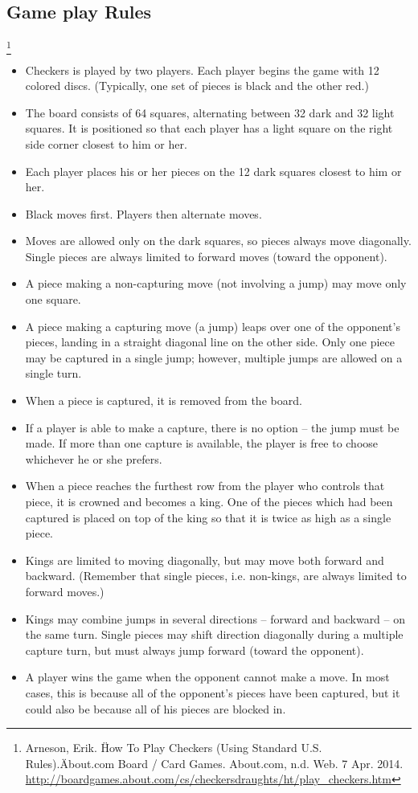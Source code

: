 \documentclass[10pt]{article}
\begin{document}
	\subsection{Game play Rules}\footnote{Arneson, Erik. \"How To Play Checkers (Using Standard U.S. Rules).\" About.com Board / Card Games. About.com, n.d. Web. 7 Apr. 2014. \url{http://boardgames.about.com/cs/checkersdraughts/ht/play_checkers.htm}}
	\begin{itemize}
		\item Checkers is played by two players. Each player begins the game with 12 colored discs. (Typically, one set of pieces is black and the other red.)
		\item The board consists of 64 squares, alternating between 32 dark and 32 light squares. It is positioned so that each player has a light square on the right side corner closest to him or her.
		\item Each player places his or her pieces on the 12 dark squares closest to him or her.
		\item Black moves first. Players then alternate moves.
		\item Moves are allowed only on the dark squares, so pieces always move diagonally. Single pieces are always limited to forward moves (toward the opponent).
		\item A piece making a non-capturing move (not involving a jump) may move only one square.
		\item A piece making a capturing move (a jump) leaps over one of the opponent's pieces, landing in a straight diagonal line on the other side. Only one piece may be captured in a single jump; however, multiple jumps are allowed on a single turn.
		\item When a piece is captured, it is removed from the board.
		\item If a player is able to make a capture, there is no option -- the jump must be made. If more than one capture is available, the player is free to choose whichever he or she prefers.
		\item When a piece reaches the furthest row from the player who controls that piece, it is crowned and becomes a king. One of the pieces which had been captured is placed on top of the king so that it is twice as high as a single piece.
		\item Kings are limited to moving diagonally, but may move both forward and backward. (Remember that single pieces, i.e. non-kings, are always limited to forward moves.)
		\item Kings may combine jumps in several directions -- forward and backward -- on the same turn. Single pieces may shift direction diagonally during a multiple capture turn, but must always jump forward (toward the opponent).
		\item A player wins the game when the opponent cannot make a move. In most cases, this is because all of the opponent's pieces have been captured, but it could also be because all of his pieces are blocked in.
	\end{itemize}
\end{document}
